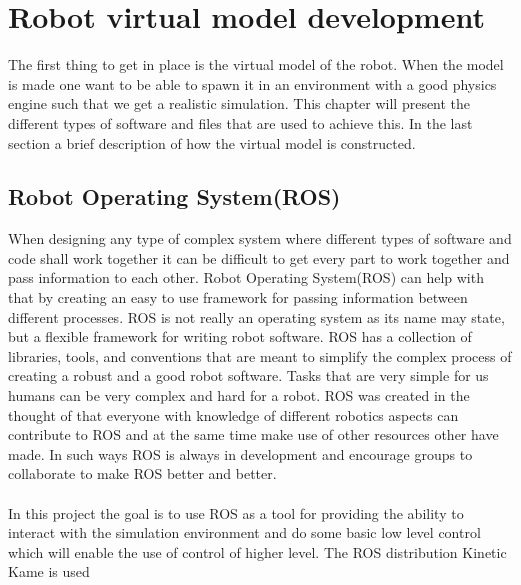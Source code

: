 \chapter{Robot virtual model development}\label{chap:soft}
The first thing to get in place is the virtual model of the robot. When the model is made one want to be able to spawn it in an environment with a good physics engine such that we get a realistic simulation. This chapter will present the different types of software and files that are used to achieve this. In the last section a brief description of how the virtual model is constructed.   %




\section{Robot Operating System(ROS)}
When designing any type of complex system where different types of software and code shall work together it can be difficult to get every part to work together and pass information to each other. Robot Operating System(ROS) can help with that by creating an easy to use framework for passing information between different processes\cite{ROS}. ROS is not really an operating system as its name may state, but a flexible framework for writing robot software\cite{ROS}. ROS has a collection of libraries, tools, and conventions that are meant to simplify the complex process of creating a robust and a good robot software. Tasks that are very simple for us humans can be very complex and hard for a robot. ROS was created in the thought of that everyone with knowledge of different robotics aspects can contribute to ROS and at the same time make use of other resources other have made. In such ways ROS is always in development and encourage groups to collaborate to make ROS better and better. \\\\
In this project the goal is to use ROS as a tool for providing the ability to interact with the simulation environment and do some basic low level control which will enable the use of control of higher level. The ROS distribution Kinetic Kame is used\cite{ROS}


